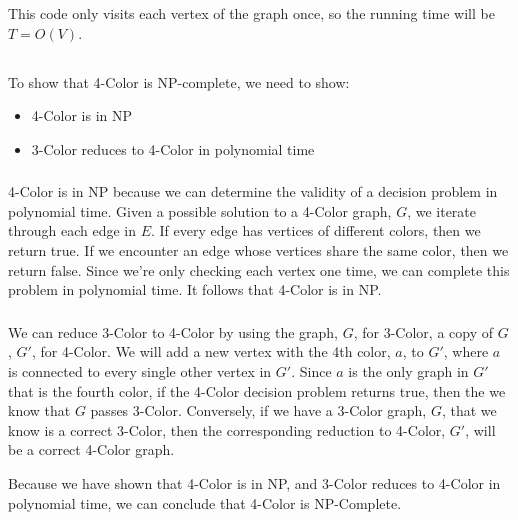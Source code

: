 \documentclass{article}
\begin{document}
This code only visits each vertex of the graph once, so the running time will be $T = O(V)$.

\subsection{}

To show that 4-Color is NP-complete, we need to show:

\begin{itemize}
    \item 4-Color is in NP
    \item 3-Color reduces to 4-Color in polynomial time
\end{itemize}

\subsubsection{}

4-Color is in NP because we can determine the validity of a decision problem in polynomial time.  Given a possible solution to a 4-Color graph, $G$, we iterate through each edge in $E$.  If every edge has vertices of different colors, then we return true.  If we encounter an edge whose vertices share the same color, then we return false.  Since we're only checking each vertex one time, we can complete this problem in polynomial time.  It follows that 4-Color is in NP.

\subsubsection{}

We can reduce 3-Color to 4-Color by using the graph, $G$, for 3-Color, a copy of $G$, $G'$, for 4-Color.  We will add a new vertex with the 4th color, $a$, to $G'$, where $a$ is connected to every single other vertex in $G'$.  Since $a$ is the only graph in $G'$ that is the fourth color, if the 4-Color decision problem returns true, then the we know that $G$ passes 3-Color.  Conversely, if we have a 3-Color graph, $G$, that we know is a correct 3-Color, then the corresponding reduction to 4-Color, $G'$, will be a correct 4-Color graph.\\


Because we have shown that 4-Color is in NP, and 3-Color reduces to 4-Color in polynomial time, we can conclude that 4-Color is NP-Complete.
\end{document}
